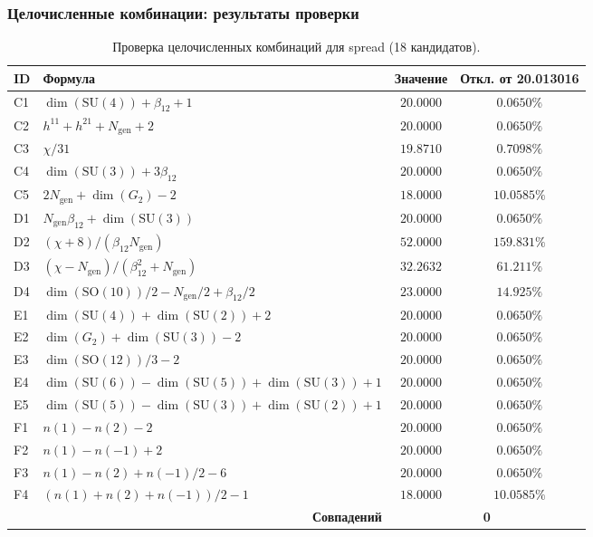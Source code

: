 \documentclass[11pt,a4paper]{article}
\newcommand{\SU}{\ensuremath{\mathrm{SU}}}
\newcommand{\SO}{\ensuremath{\mathrm{SO}}}
\theoremstyle{definition}
\begin{document}
\subsubsection{Целочисленные комбинации: результаты проверки}

\begin{table}[ht]
\centering
\footnotesize
\caption{Проверка целочисленных комбинаций для spread (18 кандидатов).}
\label{tab:app-spread-integers}
\begin{tabular}{llcc}
\toprule
ID & Формула & Значение & Откл. от 20.013016 \\
\midrule
C1 & $\dim(\SU(4)) + \beta_{12} + 1$ & $20.0000$ & $0.0650\%$ \\
C2 & $h^{11} + h^{21} + N_{\text{gen}} + 2$ & $20.0000$ & $0.0650\%$ \\
C3 & $\chi/31$ & $19.8710$ & $0.7098\%$ \\
C4 & $\dim(\SU(3)) + 3\beta_{12}$ & $20.0000$ & $0.0650\%$ \\
C5 & $2 N_{\text{gen}} + \dim(G_2) - 2$ & $18.0000$ & $10.0585\%$ \\
D1 & $N_{\text{gen}} \beta_{12} + \dim(\SU(3))$ & $20.0000$ & $0.0650\%$ \\
D2 & $(\chi + 8)/(\beta_{12} N_{\text{gen}})$ & $52.0000$ & $159.831\%$ \\
D3 & $(\chi - N_{\text{gen}})/(\beta_{12}^2 + N_{\text{gen}})$ & $32.2632$ & $61.211\%$ \\
D4 & $\dim(\SO(10))/2 - N_{\text{gen}}/2 + \beta_{12}/2$ & $23.0000$ & $14.925\%$ \\
E1 & $\dim(\SU(4)) + \dim(\SU(2)) + 2$ & $20.0000$ & $0.0650\%$ \\
E2 & $\dim(G_2) + \dim(\SU(3)) - 2$ & $20.0000$ & $0.0650\%$ \\
E3 & $\dim(\SO(12))/3 - 2$ & $20.0000$ & $0.0650\%$ \\
E4 & $\dim(\SU(6)) - \dim(\SU(5)) + \dim(\SU(3)) + 1$ & $20.0000$ & $0.0650\%$ \\
E5 & $\dim(\SU(5)) - \dim(\SU(3)) + \dim(\SU(2)) + 1$ & $20.0000$ & $0.0650\%$ \\
F1 & $n(1) - n(2) - 2$ & $20.0000$ & $0.0650\%$ \\
F2 & $n(1) - n(-1) + 2$ & $20.0000$ & $0.0650\%$ \\
F3 & $n(1) - n(2) + n(-1)/2 - 6$ & $20.0000$ & $0.0650\%$ \\
F4 & $(n(1) + n(2) + n(-1))/2 - 1$ & $18.0000$ & $10.0585\%$ \\
\midrule
\multicolumn{2}{r}{\textbf{Совпадений}} & \multicolumn{2}{c}{\textbf{0}} \\
\bottomrule
\end{tabular}
\end{table}
\end{document}
